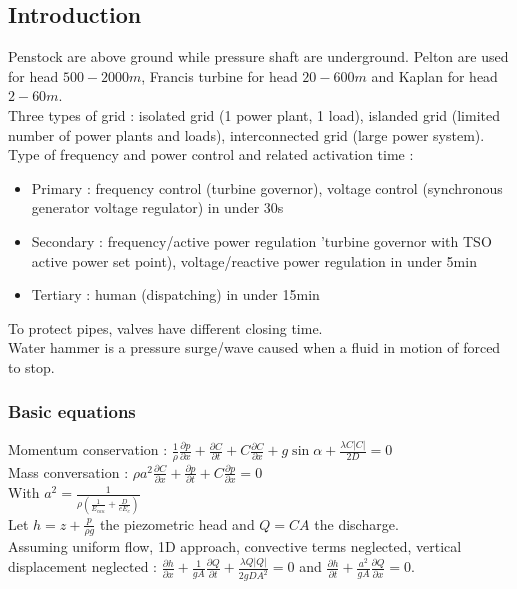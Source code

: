 \documentclass[../main.tex]{subfiles}
\begin{document}
\localtableofcontents

\subsection{Introduction}
Penstock are above ground while pressure shaft are underground. Pelton are used for head $500-2000m$, Francis turbine for head $20-600m$ and Kaplan for head $2-60m$.\\
Three types of grid : isolated grid (1 power plant, 1 load), islanded grid (limited number of power plants and loads), interconnected grid (large power system).\\

Type of frequency and power control and related activation time : \begin{itemize}
    \item Primary : frequency control (turbine governor), voltage control (synchronous generator voltage regulator) in under 30s
    \item Secondary : frequency/active power regulation 'turbine governor with TSO active power set point), voltage/reactive power regulation in under 5min
    \item Tertiary : human (dispatching) in under 15min
\end{itemize}

To protect pipes, valves have different closing time. \\
Water hammer is a pressure surge/wave caused when a fluid in motion of forced to stop. \\

\subsubsection{Basic equations}
Momentum conservation : $\frac{1}{\rho} \frac{\partial p}{\partial x} + \frac{\partial C}{\partial t}  + C \frac{\partial C}{\partial x} + g\sin \alpha + \frac{\lambda C \lvert C \rvert }{2D} = 0$\\
Mass conversation : $\rho a^2 \frac{\partial C}{\partial x} + \frac{\partial p}{\partial t} + C\frac{\partial p}{\partial x} = 0$\\
With $a^2 = \frac{1}{\rho (\frac{1}{E_{eau}} + \frac{D}{eE_c})}$\\
Let $h=z+\frac{p}{\rho g}$ the piezometric head and $Q=CA$ the discharge.\\
Assuming uniform flow, 1D approach, convective terms neglected, vertical displacement neglected : $\frac{\partial h}{\partial x} + \frac{1}{gA} \frac{\partial Q}{\partial t} + \frac{\lambda Q \lvert Q\rvert}{2gDA^2} = 0$ and $\frac{\partial h}{\partial t} + \frac{a^2}{gA} \frac{\partial Q}{\partial x} = 0$.\\
\end{document}
